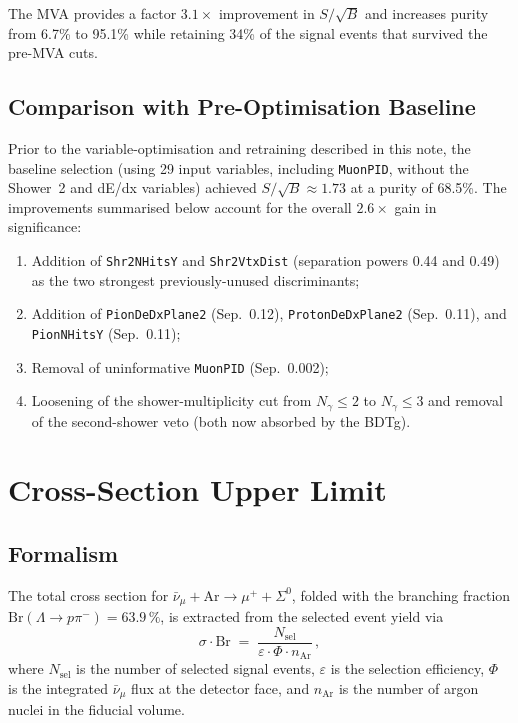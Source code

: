 \documentclass[12pt,a4paper]{article}
\begin{document}
The MVA provides a factor $3.1\times$ improvement in $S/\sqrt{B}$ and
increases purity from 6.7\% to 95.1\% while retaining 34\% of the
signal events that survived the pre-MVA cuts.

\subsection{Comparison with Pre-Optimisation Baseline}

Prior to the variable-optimisation and retraining described in this
note, the baseline selection (using 29 input variables, including
\texttt{MuonPID}, without the Shower~2 and dE/dx variables) achieved
$S/\sqrt{B} \approx 1.73$ at a purity of 68.5\%.  The improvements
summarised below account for the overall $2.6\times$ gain in significance:

\begin{enumerate}
  \item Addition of \texttt{Shr2NHitsY} and \texttt{Shr2VtxDist}
        (separation powers 0.44 and 0.49) as the two strongest
        previously-unused discriminants;
  \item Addition of \texttt{PionDeDxPlane2} (Sep.~0.12),
        \texttt{ProtonDeDxPlane2} (Sep.~0.11), and
        \texttt{PionNHitsY} (Sep.~0.11);
  \item Removal of uninformative \texttt{MuonPID} (Sep.~0.002);
  \item Loosening of the shower-multiplicity cut from $N_\gamma \le 2$
        to $N_\gamma \le 3$ and removal of the second-shower veto
        (both now absorbed by the BDTg).
\end{enumerate}

\section{Cross-Section Upper Limit}
\label{sec:xsec}

\subsection{Formalism}

The total cross section for $\bar\nu_\mu + \text{Ar} \to \mu^+ + \Sigma^0$,
folded with the branching fraction
$\text{Br}(\Lambda \to p\pi^-)= 63.9\,\%$,
is extracted from the selected event yield via
\begin{equation}
  \sigma \cdot \text{Br} \;=\;
  \frac{N_\text{sel}}{\varepsilon \cdot \Phi \cdot n_\text{Ar}}\,,
  \label{eq:xsec}
\end{equation}
where $N_\text{sel}$ is the number of selected signal events,
$\varepsilon$ is the selection efficiency, $\Phi$ is the integrated
$\bar\nu_\mu$ flux at the detector face, and $n_\text{Ar}$ is the
number of argon nuclei in the fiducial volume.
\end{document}
